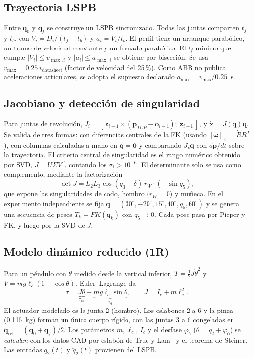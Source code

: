 \documentclass[conference]{IEEEtran}
\begin{document}
\subsection{Trayectoria LSPB}
Entre $\mathbf{q}_0$ y $\mathbf{q}_f$ se construye un LSPB sincronizado. Todas las juntas comparten $t_f$ y $t_b$, con
$V_i = D_i/(t_f - t_b)$ y $a_i = V_i/t_b$. El perfil tiene un arranque parabólico, un tramo de velocidad constante y
un frenado parabólico. El $t_f$ mínimo que cumple $|V_i| \le v_{\max,i}$ y $|a_i| \le a_{\max,i}$ se obtiene por
bisección. Se usa $v_{\max} = 0.25\,v_{\text{datasheet}}$ (factor de velocidad del 25\,\%). Como ABB no publica
aceleraciones articulares, se adopta el supuesto declarado $a_{\max} = v_{\max}/0.25$~s.

\subsection{Jacobiano y detección de singularidad}
Para juntas de revolución,
$J_i = [\,\mathbf{z}_{i-1}\times(\mathbf{p}_{TCP} - \mathbf{o}_{i-1});\ \mathbf{z}_{i-1}\,]$, y
$\dot{\mathbf{x}} = J(\mathbf{q})\dot{\mathbf{q}}$. Se valida de tres formas: con diferencias centrales de la FK
(usando $[\bm{\omega}]_\times = \dot RR^T$), con columnas calculadas a mano en $\mathbf{q} = \mathbf{0}$ y comparando
$J_v\dot{\mathbf{q}}$ con $d\mathbf{p}/dt$ sobre la trayectoria. El criterio central de singularidad es el rango
numérico obtenido por SVD, $J = U\Sigma V^T$, contando los $\sigma_i > 10^{-6}$. El determinante solo se usa como
complemento, mediante la factorización
\begin{equation}
\det J = L_2L_3\cos(q_3-\delta)\,r_W\cdot(-\sin q_5),
\label{eq:det}
\end{equation}
que expone las singularidades de codo, hombro ($r_W = 0$) y muñeca. En el experimento independiente se fija
$\mathbf{q} = (30^\circ, -20^\circ, 15^\circ, 40^\circ, q_5, 60^\circ)$ y se genera una secuencia de poses
$T_k = FK(\mathbf{q}_k)$ con $q_5 \to 0$. Cada pose pasa por Pieper y FK, y luego por la SVD de $J$.

\subsection{Modelo dinámico reducido (1R)}
Para un péndulo con $\theta$ medido desde la vertical inferior, $T = \tfrac12 J\dot\theta^2$ y
$V = mg\ell_c(1 - \cos\theta)$. Euler--Lagrange da
\begin{equation}
\tau = \underbrace{J\ddot\theta}_{\tau_{in}} + \underbrace{mg\ell_c\sin\theta}_{\tau_g},\qquad J = I_c + m\ell_c^2.
\label{eq:1r}
\end{equation}
El actuador modelado es la junta 2 (hombro). Los eslabones 2 a 6 y la pinza (0.115~kg) forman un único cuerpo rígido,
con las juntas 3 a 6 congeladas en $\mathbf{q}_{\text{ref}} = (\mathbf{q}_0 + \mathbf{q}_f)/2$. Los parámetros $m$,
$\ell_c$, $I_c$ y el desfase $\varphi_0$ ($\theta = q_2 + \varphi_0$) se \emph{calculan} con los datos CAD por eslabón
de Truc y Lam~\cite{truc} y el teorema de Steiner. Las entradas $q_2(t)$ y $\ddot q_2(t)$ provienen del LSPB.
\end{document}

